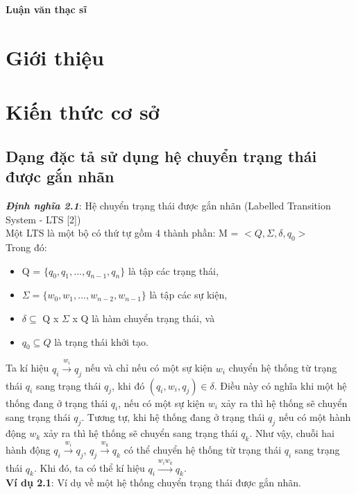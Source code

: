 \documentclass[a4paper,13pt,oneside,openany]{book}
\begin{document}
	\begin{center}
		\textbf{\large Luận văn thạc sĩ}
	\end{center}
	\begin{flushleft}
	\chapter{Giới thiệu}
	\chapter{Kiến thức cơ sở}
		\section{Dạng đặc tả sử dụng hệ chuyển trạng thái được gắn nhãn}
		\justify
		\textbf{\textit{Định nghĩa 2.1}}: Hệ chuyển trạng thái được gắn nhãn (Labelled Transition System - LTS [2])\\
		Một LTS là một bộ có thứ tự gồm 4 thành phần: M = $<Q, \Sigma, \delta, q_{0}>$\\
		Trong đó:\\
		\begin{itemize}
			\item Q = $\{q_{0}, q_{1}, ..., q_{n-1}, q_{n}\}$ là tập các trạng thái,
			\item $\Sigma = \{w_{0}, w_{1}, ..., w_{n-2}, w_{n-1}\}$ là tập các sự kiện,
			\item $\delta \subseteq$ Q x $\Sigma$ x Q là hàm chuyển trạng thái, và
			\item $q_{0} \subseteq Q$ là trạng thái khởi tạo.\\
		\end{itemize}
		Ta kí hiệu $q_i \overset{w_i}{\longrightarrow} q_{j}$ nếu và chỉ nếu có một sự kiện $w_i$ chuyển hệ thống từ trạng thái $q_i$ sang trạng thái $q_j$, khi đó $(q_i, w_i, q_j) \in \delta$. Điều này có nghĩa khi một hệ thống đang ở trạng thái $q_i$, nếu có một sự kiện $w_i$ xảy ra thì hệ thống sẽ chuyển sang trạng thái $q_j$. Tương tự, khi hệ thống đang ở trạng thái $q_j$ nếu có một hành động $w_k$ xảy ra thì hệ thống sẽ chuyển sang trạng thái $q_k$. Như vậy, chuỗi hai hành động  $q_i \overset{w_i}{\longrightarrow} q_j$,  $q_j \overset{w_k}{\longrightarrow} q_k$ có thể chuyển hệ thống từ trạng thái $q_i$ sang trạng thái $q_k$. Khi đó, ta có thể kí hiệu  $q_i \overset{w_iw_k}{\longrightarrow} q_{k}$.\\
		\textbf{Ví dụ 2.1}: Ví dụ về một hệ thống chuyển trạng thái được gắn nhãn.\\

\end{flushleft}
\end{document}
